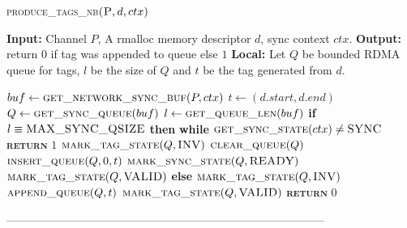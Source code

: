 \documentclass[10pt]{article}
\begin{document}
\begin{algorithm}{}
\footnotesize
\caption{\textsc{produce\_tags\_nb}{$\textsc{(P}, d, ctx)$}}
\label{alg:prod_tags} 
\begin{algorithmic}[1]

\STATE \textbf{Input:} Channel $P$, A rmalloc memory descriptor $d$, sync context $ctx$.
\STATE \textbf{Output:} return {$0$} if tag was appended to queue else {$1$}
\STATE \textbf{Local:} Let $Q$ be bounded RDMA queue for tags, $l$ be the size of $Q$ and $t$ be the tag generated from $d$.

\STATE $\textbf{$buf$} \leftarrow  \textsc{get\_network\_sync\_buf}(P, ctx)$ 
\STATE $\textbf{$t$} \leftarrow  {(d.start, d.end)}$ 
\STATE $\textbf{$Q$} \leftarrow  \textsc{get\_sync\_queue}(buf)$ 
\STATE $\textbf{$l$} \leftarrow  \textsc{get\_queue\_len}(buf)$ 
\STATE \textbf{if} $l \equiv \textsc{MAX\_SYNC\_QSIZE}$  \textbf{then} 
\STATE \quad \textbf{while}  $\textsc{get\_sync\_state}(ctx) \neq \textsc{SYNC}$
\STATE \qquad \textsc{\textbf{return}} {$1$}
\STATE \quad  $\textsc{mark\_tag\_state}(Q, \textsc{INV})$
\STATE \quad  $\textsc{clear\_queue}(Q)$
\STATE \quad  $\textsc{insert\_queue}(Q, 0, t)$
\STATE \quad  $\textsc{mark\_sync\_state}(Q, \textsc{READY})$
\STATE \quad  $\textsc{mark\_tag\_state}(Q, \textsc{VALID})$
\STATE \textbf{else}
\STATE \quad  $\textsc{mark\_tag\_state}(Q, \textsc{INV})$
\STATE \quad  $\textsc{append\_queue}(Q, t)$
\STATE \quad  $\textsc{mark\_tag\_state}(Q, \textsc{VALID})$
\STATE \textsc{\textbf{return}} {$0$}
\STATE


\end{algorithmic}
\end{algorithm}


 ------------------------------------------------------------------------------------

\end{document}
